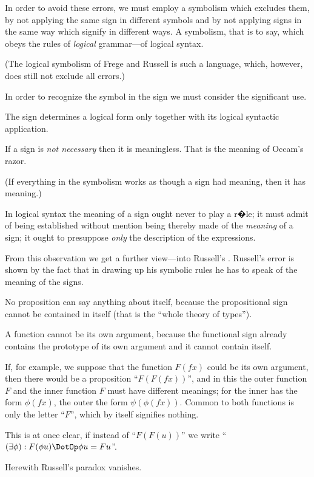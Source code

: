 {In order to avoid these errors, we must employ
a symbolism which excludes them, by not applying
the same sign in different symbols and by
not applying signs in the same way which signify
in different ways. A symbolism, that is to say,
which obeys the rules of \emph{logical} grammar---of logical
syntax.

(The logical symbolism of Frege and Russell
is such a language, which, however, does still not
exclude all errors.)}


{In order to recognize the symbol in the sign
we must consider the significant use.}


{The sign determines a logical form only together
with its logical syntactic application.}


{If a sign is \emph{not necessary} then it is meaningless.
That is the meaning of Occam's razor.

(If everything in the symbolism works as
though a sign had meaning, then it has meaning.)}


{In logical syntax the meaning of a sign ought
never to play a r�le; it must admit of being
established without mention being thereby made
of the \emph{meaning} of a sign; it ought to presuppose
\emph{only} the description of the expressions.}


{From this observation we get a further view---into
Russell's . Russell's error is
shown by the fact that in drawing up his symbolic
rules he has to speak of the meaning of
the signs.}


{No proposition can say anything about itself,
because the propositional sign cannot be contained
in itself (that is the ``whole theory of types'').}


{A function cannot be its own argument, because
the functional sign already contains the prototype
of its own argument and it cannot contain
itself.

{\verystretchyspace
If, for example, we suppose that the function
$F(fx)$ could be its own argument, then there would
be a proposition ``$F(F(fx))$'', and in this the outer
function $F$ and the inner function $F$ must have
different meanings; for the inner has the form
$\phi(fx)$, the outer the form $\psi(\phi(fx))$. Common to
both functions is only the letter ``$F$'', which by
itself signifies nothing.}

This is at once clear, if instead of ``$F(F(u))$'' we
write ``$(\exists\phi) : F(\phi u) \DotOp \phi u = Fu$''.

Herewith Russell's paradox vanishes.}


